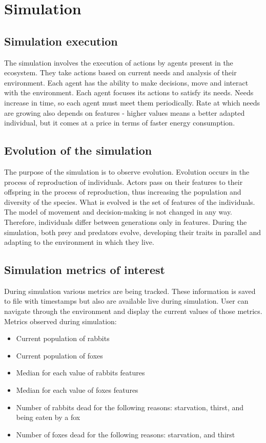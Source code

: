 \chapter{Simulation}
\label{simulationChapter}
\section{Simulation execution}
The simulation involves the execution of actions by agents present in the ecosystem. They take actions based on current needs and analysis of their environment. Each agent has the ability to make decisions, move and interact with the environment. Each agent focuses its actions to satisfy its needs. Needs increase in time, so each agent must meet them periodically. Rate at which needs are growing also depends on features - higher values means a better adapted individual, but it comes at a price in terms of faster energy consumption.

\section{Evolution of the simulation}
The purpose of the simulation is to observe evolution. Evolution occurs in the process of reproduction of individuals. Actors pass on their features to their offspring in the process of reproduction, thus increasing the population and diversity of the species. What is evolved is the set of features of the individuals. The model of movement and decision-making is not changed in any way. Therefore, individuals differ between generations only in features. During the simulation, both prey and predators evolve, developing their traits in parallel and adapting to the environment in which they live.

\section{Simulation metrics of interest}
During simulation various metrics are being tracked. These information is saved to file with timestamps but also are available live during simulation. User can navigate through the environment and display the current values of those metrics. Metrics observed during simulation:
\begin{itemize}
    \item Current population of rabbits
    \item Current population of foxes
    \item Median for each value of rabbits features 
    \item Median for each value of foxes features
    \item Number of rabbits dead for the following reasons: starvation, thirst, and being eaten by a fox
    \item Number of foxes dead for the following reasons: starvation, and thirst
\end{itemize}


